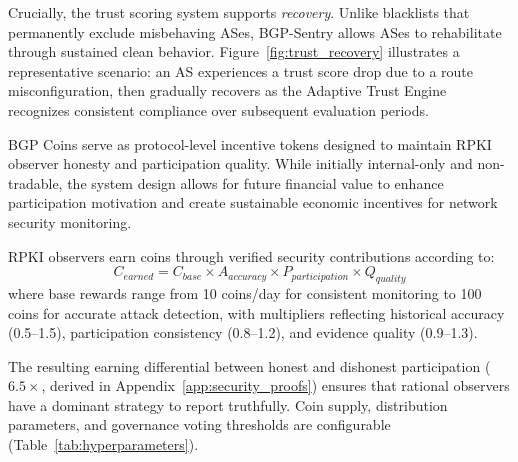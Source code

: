 Crucially, the trust scoring system supports \emph{recovery}. Unlike blacklists that permanently exclude misbehaving ASes, BGP-Sentry allows ASes to rehabilitate through sustained clean behavior. Figure~\ref{fig:trust_recovery} illustrates a representative scenario: an AS experiences a trust score drop due to a route misconfiguration, then gradually recovers as the Adaptive Trust Engine recognizes consistent compliance over subsequent evaluation periods.

 
BGP Coins serve as protocol-level incentive tokens designed to maintain RPKI observer honesty and participation quality. While initially internal-only and non-tradable, the system design allows for future financial value to enhance participation motivation and create sustainable economic incentives for network security monitoring.

RPKI observers earn coins through verified security contributions according to:
\begin{equation}
C_{earned} = C_{base} \times A_{accuracy} \times P_{participation} \times Q_{quality}
\end{equation}
where base rewards range from 10 coins/day for consistent monitoring to 100 coins for accurate attack detection, with multipliers reflecting historical accuracy (0.5--1.5), participation consistency (0.8--1.2), and evidence quality (0.9--1.3).

The resulting earning differential between honest and dishonest participation ($6.5\times$, derived in Appendix~\ref{app:security_proofs}) ensures that rational observers have a dominant strategy to report truthfully. Coin supply, distribution parameters, and governance voting thresholds are configurable (Table~\ref{tab:hyperparameters}).


